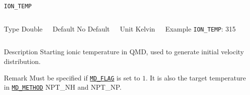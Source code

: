 \begin{frame}[allowframebreaks]{\texttt{ION\_TEMP}} \label{ION_TEMP}
\vspace*{-12pt}
\begin{columns}
\begin{block}{Type}
Double
\end{block}

\begin{block}{Default}
No Default
\end{block}

\begin{block}{Unit}
Kelvin
\end{block}

\begin{block}{Example}
\texttt{ION\_TEMP}: 315
\end{block}
\end{columns}

\begin{block}{Description}
Starting ionic temperature in QMD, used to generate initial velocity distribution.
\end{block}

\begin{block}{Remark}
Must be specified if \hyperlink{MD_FLAG}{\texttt{MD\_FLAG}} is set to $1$. It is also the target temperature in \hyperlink{MD_METHOD}{\texttt{MD\_METHOD}} NPT\_NH and NPT\_NP.
\end{block}

\end{frame}



